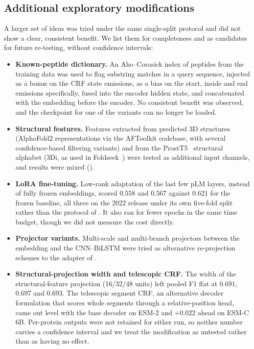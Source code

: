 \documentclass{article}
\begin{document}
\subsection{Additional exploratory modifications}

A larger set of ideas was tried under the same single-split protocol and did not show a clear, consistent benefit. We list them for completeness and as candidates for future re-testing, without confidence intervals:

\begin{itemize}
  \item \textbf{Known-peptide dictionary.} An Aho--Corasick index of peptides from the training data was used to flag substring matches in a query sequence, injected as a bonus on the CRF state emissions, as a bias on the start, inside and end emissions specifically, fused into the encoder hidden state, and concatenated with the embedding before the encoder. No consistent benefit was observed, and the checkpoint for one of the variants can no longer be loaded.
  \item \textbf{Structural features.} Features extracted from predicted 3D structures (AlphaFold2 representations via the AFToolkit codebase, with several confidence-based filtering variants) and from the ProstT5~\citep{heinzinger2023prostt5} structural alphabet (3Di, as used in Foldseek~\citep{vankempen2024foldseek}) were tested as additional input channels, and results were mixed ().
  \item \textbf{LoRA fine-tuning.} Low-rank adaptation of the last few pLM layers, instead of fully frozen embeddings, scored $0.558$ and $0.567$ against $0.621$ for the frozen baseline, all three on the 2022 release under its own five-fold split rather than the protocol of . It also ran for fewer epochs in the same time budget, though we did not measure the cost directly.
  \item \textbf{Projector variants.} Multi-scale and multi-branch projectors between the embedding and the CNN--BiLSTM were tried as alternative re-projection schemes to the adapter of .
  \item \textbf{Structural-projection width and telescopic CRF.} The width of the structural-feature projection (16/32/48 units) left pooled F1 flat at $0.691$, $0.697$ and $0.693$. The telescopic segment CRF, an alternative decoder formulation that scores whole segments through a relative-position head, came out level with the base decoder on ESM-2 and $+0.022$ ahead on ESM-C 6B. Per-protein outputs were not retained for either run, so neither number carries a confidence interval and we treat the modification as untested rather than as having no effect.
\end{itemize}
\end{document}
